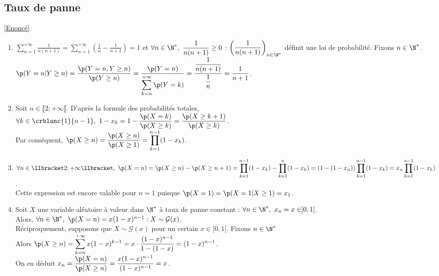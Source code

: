 \documentclass[8pt]{book}
\begin{document}
	\subsection{Taux de panne }
	\label{Taux de panne corrigé}
	\textcolor{blue}{\hyperref[Taux de panne]{[Enoncé]}}\\
	\begin{enumerate}
		\item $\displaystyle\sum\limits_{n=1}^{+\infty}\frac{1}{n(n+1)}=\sum\limits_{n=1}^{+\infty}\left(\frac{1}{n}-\frac{1}{n+1}\right)=1$ et $\forall n\in \N^*,\ \displaystyle\frac{1}{n(n+1)}\geq 0$ : $\left(\displaystyle\frac{1}{n(n+1)}\right)_{n\in \N^*}$ définit une loi de probabilité. Fixons $n\in \N^*$.\\
		$\p(Y=n|Y\geq n)=\displaystyle\frac{\p(Y=n,Y\geq n)}{\p(Y\geq n)}=\frac{\p(Y=n)}{\displaystyle\sum\limits_{k=n}^{+\infty}\p(Y=k)}=\frac{\displaystyle\frac{1}{n(n+1)}}{\displaystyle\frac{1}{n}}=\frac{1}{n+1}$.
		\item Soit $n\in \llbracket2;+\infty\llbracket$. D'après la formule des probabilités totales,\\
		$\forall k\in \crblanc{1}{n-1},\ 1-x_k=1-\displaystyle\frac{\p(X=k)}{\p(X\geq k)}=\frac{\p(X\geq k+1)}{\p(X\geq k)}$.\\
		Par conséquent, $\p(X\geq n)=\displaystyle\frac{\p(X\geq n)}{\p(X\geq 1)}=\prod\limits_{k=1}^{n-1}(1-x_k)$.
		\item $\forall n\in \llbracket2;+\infty\llbracket,\ \p(X=n)=\p(X\geq n)-\p(X\geq n+1)=\displaystyle\prod\limits_{k=1}^{n-1}(1-x_k)-\prod\limits_{k=1}^n(1-x_k)=(1-(1-x_n))\prod\limits_{k=1}^{n-1}(1-x_k)=x_n\prod\limits_{k=1}^{n-1}(1-x_k)$.\\
		Cette expression est encore valable pour $n=1$ puisque $\p(X=1)=\p(X=1|X\geq 1)=x_1$.
		\item Soit $X$ une variable aléatoire à valeur dans $\N^*$ à taux de panne constant : $\forall n\in \N^*,\ x_n=x\in ]0,1[$.\\
		Alors, $\forall n\in \N^*,\ \p(X=n)=x(1-x)^{n-1} : X\sim\mathcal{G}(x)$.\\
		Réciproquement, supposons que $X\sim \mathcal{G}(x)$ pour un certain $x\in ]0,1[$. Fixons $n\in \N^*$\\
		Alors $\p(X\geq n)=\displaystyle\sum\limits_{k=n}^{+\infty}x(1-x)^{k-1}=x\cdot\frac{(1-x)^{n-1}}{1-(1-x)}=(1-x)^{n-1}$.\\
		On en déduit $x_n=\displaystyle\frac{\p(X=n)}{\p(X\geq n)}=\frac{x(1-x)^{n-1}}{(1-x)^{n-1}}=x$.
	\end{enumerate}
	
\end{document}
